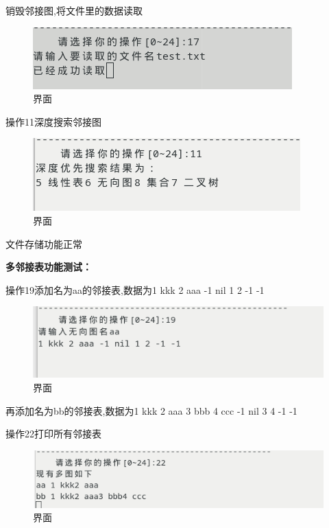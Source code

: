 \documentclass[supercite]{Experimental_Report}
\theoremstyle{definition}
\begin{document}
销毁邻接图,将文件里的数据读取

\begin{figure}[!htb]
	\begin{center}
		\includegraphics[scale=0.60]{images/2-28.png}
		\caption{界面}
		\label{fig2-28}
		\end{center}
\end{figure}

操作11深度搜索邻接图

\begin{figure}[!htb]
	\begin{center}
		\includegraphics[scale=0.60]{images/2-29.png}
		\caption{界面}
		\label{fig2-29}
		\end{center}
\end{figure}

文件存储功能正常

\textbf{多邻接表功能测试：}

操作19添加名为aa的邻接表,数据为1 kkk 2 aaa -1 nil 1 2 -1 -1

\begin{figure}[!htb]
	\begin{center}
		\includegraphics[scale=0.60]{images/2-30.png}
		\caption{界面}
		\label{fig2-30}
		\end{center}
\end{figure}

再添加名为bb的邻接表,数据为1 kkk 2 aaa 3 bbb 4 ccc -1 nil 3 4 -1 -1

操作22打印所有邻接表

\begin{figure}[!htb]
	\begin{center}
		\includegraphics[scale=0.60]{images/2-31.png}
		\caption{界面}
		\label{fig2-31}
		\end{center}
\end{figure}
\end{document}
